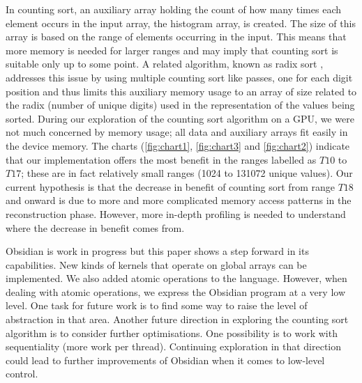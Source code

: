 In counting sort, an auxiliary array holding the count of how many times 
each element occurs in the input array, the histogram array, is created. 
The size of this array is 
based on the range of elements occurring in the input. This means that 
more memory is needed for larger ranges and may imply that counting sort 
is suitable only up to some point. A related algorithm, known as radix 
sort \cite{Knuth}, addresses this issue by using multiple counting sort 
like passes, one for each digit position and thus limits this auxiliary 
memory usage to an array of size related to the radix (number of unique 
digits) used in the representation of the values being sorted. During 
our exploration of the counting sort algorithm on a GPU, we were not much 
concerned by memory usage; all data and auxiliary 
arrays fit easily in the device memory. The charts (\ref{fig:chart1}, \ref{fig:chart3} and \ref{fig:chart2}) indicate that our implementation offers the most 
benefit in the ranges labelled as $T10$ to $T17$; these are in fact relatively 
small ranges (1024 to 131072 unique values). Our current hypothesis 
is that the decrease in benefit of counting sort from range $T18$ and onward
is due to more and more complicated memory access patterns in the 
reconstruction phase. However, more in-depth profiling is needed to 
understand where the decrease in benefit comes from.

Obsidian is work in progress but this paper shows a step forward in its
capabilities. New kinds of kernels that operate on global arrays can be 
implemented. We also added atomic operations to the language. However, 
when dealing with atomic operations, we express the Obsidian program 
at a very low level. 
One task for future work is to find some way to raise 
the level of abstraction in that area. Another future direction in exploring 
the counting sort algorithm is to consider further optimisations.
One possibility is to work with sequentiality 
(more work per thread). Continuing exploration in that direction could lead 
to further improvements of Obsidian when it comes to low-level control.  

